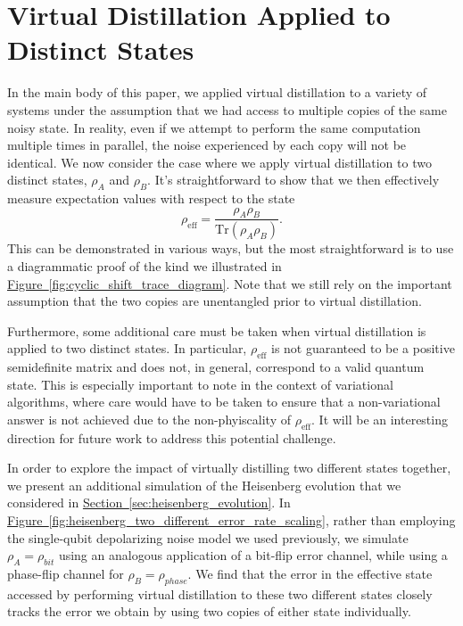 \documentclass[
amsmath,
amssymb,
aps,
pra,
reprint,
twocolumn,
superscriptaddress,
longbibliography,
showkeys,
floatfix
]{revtex4-1}
\def\tr{\mathrm{Tr}}
\renewcommand{\sec}[1]{\hyperref[sec:#1]{Section~\ref*{sec:#1}}}
\newcommand{\fig}[1]{\hyperref[fig:#1]{Figure~\ref*{fig:#1}}}
\begin{document}
\section{Virtual Distillation Applied to Distinct States}
\label{app:different_noise_models}

In the main body of this paper, we applied virtual distillation to a variety of
systems under the assumption that we had access to multiple copies of the same
noisy state.
In reality, even if we attempt to perform the same computation multiple times in
parallel, the noise experienced by each copy will not be identical.
We now consider the case where we apply virtual distillation to two distinct states,
\(\rho_A\) and \(\rho_B\).
It's straightforward to show that we then effectively measure expectation values
with respect to the state
\begin{equation}
    \rho_\textrm{eff} = \frac{\rho_A\rho_B}{\tr(\rho_A\rho_B)}.
\end{equation}
This can be demonstrated in various ways, but the most straightforward is to use a diagrammatic proof of the kind we illustrated in \fig{cyclic_shift_trace_diagram}.
Note that we still rely on the important assumption that the two copies are
unentangled prior to virtual distillation.

Furthermore, some additional care must be taken when virtual distillation is applied to two distinct states. In particular, \(\rho_\textrm{eff}\) is not guaranteed to be a positive semidefinite matrix and does not, in general, correspond to a valid quantum state. This is especially important to note in the context of variational algorithms, where care would have to be taken to ensure that a non-variational answer is not achieved due to the non-phyiscality of \(\rho_\textrm{eff}\). It will be an interesting direction for future work to address this potential challenge.

In order to explore the impact of virtually distilling two different states
together, we present an additional simulation of the Heisenberg evolution that
we considered in \sec{heisenberg_evolution}. 
In \fig{heisenberg_two_different_error_rate_scaling}, rather than employing the
single-qubit depolarizing noise model we used previously, we simulate \(\rho_A
= \rho_{bit}\) using an analogous application of a bit-flip error channel, while
using a phase-flip channel for \(\rho_B = \rho_{phase}\). 
We find that the error in the effective state accessed by performing virtual
distillation to these two different states closely tracks the error we obtain by
using two copies of either state individually.
\end{document}
